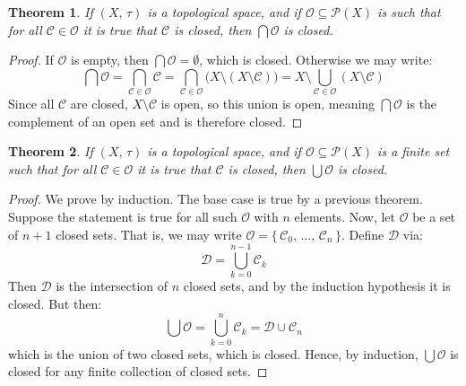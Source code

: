 \documentclass{article}
\theoremstyle{plain}
\newtheorem{theorem}{Theorem}[section]
\theoremstyle{normal}
\begin{document}
        \begin{theorem}
            If $(X,\,\tau)$ is a topological space, and if
            $\mathcal{O}\subseteq\mathcal{P}(X)$ is such that for all
            $\mathcal{C}\in\mathcal{O}$ it is true that $\mathcal{C}$ is closed,
            then $\bigcap\mathcal{O}$ is closed.
        \end{theorem}
        \begin{proof}
            If $\mathcal{O}$ is empty, then $\bigcap\mathcal{O}=\emptyset$,
            which is closed. Otherwise we may write:
            \begin{equation}
                \bigcap\mathcal{O}
                =\bigcap_{\mathcal{C}\in\mathcal{O}}\mathcal{C}
                =\bigcap_{\mathcal{C}\in\mathcal{O}}\Big(
                    X\setminus(X\setminus\mathcal{C})
                \Big)
                =X\setminus\bigcup_{\mathcal{C}\in\mathcal{O}}(
                    X\setminus\mathcal{C}
                )
            \end{equation}
            Since all $\mathcal{C}$ are closed, $X\setminus\mathcal{C}$ is open,
            so this union is open, meaning $\bigcap\mathcal{O}$ is the
            complement of an open set and is therefore closed.
        \end{proof}
        \begin{theorem}
            If $(X,\,\tau)$ is a topological space, and if
            $\mathcal{O}\subseteq\mathcal{P}(X)$ is a finite set such that for
            all $\mathcal{C}\in\mathcal{O}$ it is true that $\mathcal{C}$ is
            closed, then $\bigcup\mathcal{O}$ is closed.
        \end{theorem}
        \begin{proof}
            We prove by induction. The base case is true by a previous
            theorem. Suppose the statement is true for all such $\mathcal{O}$
            with $n$ elements. Now, let $\mathcal{O}$ be a set of $n+1$ closed
            sets. That is, we may write
            $\mathcal{O}=\{\,\mathcal{C}_{0},\,\dots,\,\mathcal{C}_{n}\,\}$.
            Define $\mathcal{D}$ via:
            \begin{equation}
                \mathcal{D}=\bigcup_{k=0}^{n-1}\mathcal{C}_{k}
            \end{equation}
            Then $\mathcal{D}$ is the intersection of $n$ closed sets, and by
            the induction hypothesis it is closed. But then:
            \begin{equation}
                \bigcup\mathcal{O}
                =\bigcup_{k=0}^{n}\mathcal{C}_{k}
                =\mathcal{D}\cup\mathcal{C}_{n}
            \end{equation}
            which is the union of two closed sets, which is closed. Hence,
            by induction, $\bigcup\mathcal{O}$ is closed for any finite
            collection of closed sets.
        \end{proof}
\end{document}
